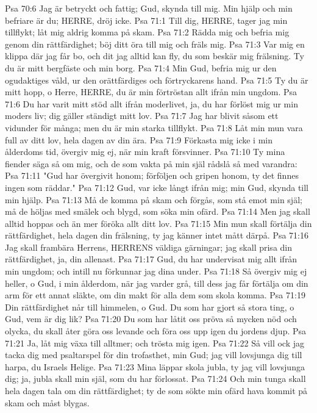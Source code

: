 Psa 70:6  Jag är betryckt och fattig; Gud, skynda till mig. Min hjälp och min befriare är du; HERRE, dröj icke.
Psa 71:1  Till dig, HERRE, tager jag min tillflykt; låt mig aldrig komma på skam.
Psa 71:2  Rädda mig och befria mig genom din rättfärdighet; böj ditt öra till mig och fräls mig.
Psa 71:3  Var mig en klippa där jag får bo, och dit jag alltid kan fly, du som beskär mig frälsning. Ty du är mitt bergfäste och min borg.
Psa 71:4  Min Gud, befria mig ur den ogudaktiges våld, ur den orättfärdiges och förtryckarens hand.
Psa 71:5  Ty du är mitt hopp, o Herre, HERRE, du är min förtröstan allt ifrån min ungdom.
Psa 71:6  Du har varit mitt stöd allt ifrån moderlivet, ja, du har förlöst mig ur min moders liv; dig gäller ständigt mitt lov.
Psa 71:7  Jag har blivit såsom ett vidunder för många; men du är min starka tillflykt.
Psa 71:8  Låt min mun vara full av ditt lov, hela dagen av din ära.
Psa 71:9  Förkasta mig icke i min ålderdoms tid, övergiv mig ej, när min kraft försvinner.
Psa 71:10  Ty mina fiender säga så om mig, och de som vakta på min själ rådslå så med varandra:
Psa 71:11  "Gud har övergivit honom; förföljen och gripen honom, ty det finnes ingen som räddar."
Psa 71:12  Gud, var icke långt ifrån mig; min Gud, skynda till min hjälp.
Psa 71:13  Må de komma på skam och förgås, som stå emot min själ; må de höljas med smälek och blygd, som söka min ofärd.
Psa 71:14  Men jag skall alltid hoppas och än mer föröka allt ditt lov.
Psa 71:15  Min mun skall förtälja din rättfärdighet, hela dagen din frälsning, ty jag känner intet mått därpå.
Psa 71:16  Jag skall frambära Herrens, HERRENS väldiga gärningar; jag skall prisa din rättfärdighet, ja, din allenast.
Psa 71:17  Gud, du har undervisat mig allt ifrån min ungdom; och intill nu förkunnar jag dina under.
Psa 71:18  Så övergiv mig ej heller, o Gud, i min ålderdom, när jag varder grå, till dess jag får förtälja om din arm för ett annat släkte, om din makt för alla dem som skola komma.
Psa 71:19  Din rättfärdighet når till himmelen, o Gud. Du som har gjort så stora ting, o Gud, vem är dig lik?
Psa 71:20  Du som har låtit oss pröva så mycken nöd och olycka, du skall åter göra oss levande och föra oss upp igen du jordens djup.
Psa 71:21  Ja, låt mig växa till alltmer; och trösta mig igen.
Psa 71:22  Så vill ock jag tacka dig med psaltarspel för din trofasthet, min Gud; jag vill lovsjunga dig till harpa, du Israels Helige.
Psa 71:23  Mina läppar skola jubla, ty jag vill lovsjunga dig; ja, jubla skall min själ, som du har förlossat.
Psa 71:24  Och min tunga skall hela dagen tala om din rättfärdighet; ty de som sökte min ofärd hava kommit på skam och måst blygas.

